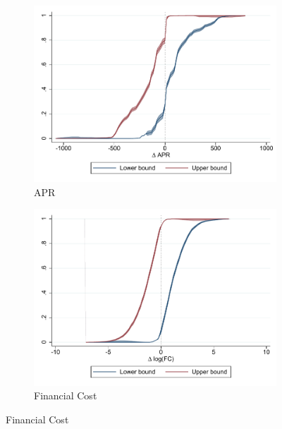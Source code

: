 \documentclass[oneside,11pt]{article}
\begin{document}
\begin{figure}[H]
    \caption{Fan \& Park bounds}
    \label{fan_park_bounds}
    \begin{center}

    \begin{subfigure}{0.475\textwidth}
        \caption{APR}
        \centering
        \includegraphics[width=\textwidth]{Figuras/fan_park_bounds_apr.pdf}
    \end{subfigure}
    \begin{subfigure}{0.475\textwidth}
        \caption{Financial Cost}
        \centering
        \includegraphics[width=\textwidth]{Figuras/fan_park_bounds_fc_admin.pdf}
    \end{subfigure}
    \end{center}
\end{figure}
\end{document}
